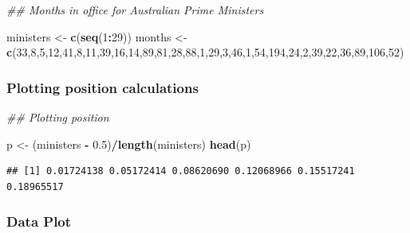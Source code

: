 \documentclass[
]{article}
\newenvironment{Shaded}{\begin{snugshade}}{\end{snugshade}}
\newcommand{\CommentTok}[1]{\textcolor[rgb]{0.56,0.35,0.01}{\textit{#1}}}
\newcommand{\DecValTok}[1]{\textcolor[rgb]{0.00,0.00,0.81}{#1}}
\newcommand{\FloatTok}[1]{\textcolor[rgb]{0.00,0.00,0.81}{#1}}
\newcommand{\KeywordTok}[1]{\textcolor[rgb]{0.13,0.29,0.53}{\textbf{#1}}}
\newcommand{\NormalTok}[1]{#1}
\newcommand{\OperatorTok}[1]{\textcolor[rgb]{0.81,0.36,0.00}{\textbf{#1}}}
\newcommand{\StringTok}[1]{\textcolor[rgb]{0.31,0.60,0.02}{#1}}
\begin{document}
\begin{Shaded}
\begin{Highlighting}[]
\CommentTok{## Months in office for Australian Prime Ministers}

\NormalTok{ministers <-}\StringTok{ }\KeywordTok{c}\NormalTok{(}\KeywordTok{seq}\NormalTok{(}\DecValTok{1}\OperatorTok{:}\DecValTok{29}\NormalTok{))}
\NormalTok{months <-}\StringTok{ }\KeywordTok{c}\NormalTok{(}\DecValTok{33}\NormalTok{,}\DecValTok{8}\NormalTok{,}\DecValTok{5}\NormalTok{,}\DecValTok{12}\NormalTok{,}\DecValTok{41}\NormalTok{,}\DecValTok{8}\NormalTok{,}\DecValTok{11}\NormalTok{,}\DecValTok{39}\NormalTok{,}\DecValTok{16}\NormalTok{,}\DecValTok{14}\NormalTok{,}\DecValTok{89}\NormalTok{,}\DecValTok{81}\NormalTok{,}\DecValTok{28}\NormalTok{,}\DecValTok{88}\NormalTok{,}\DecValTok{1}\NormalTok{,}\DecValTok{29}\NormalTok{,}\DecValTok{3}\NormalTok{,}\DecValTok{46}\NormalTok{,}\DecValTok{1}\NormalTok{,}\DecValTok{54}\NormalTok{,}\DecValTok{194}\NormalTok{,}\DecValTok{24}\NormalTok{,}\DecValTok{2}\NormalTok{,}\DecValTok{39}\NormalTok{,}\DecValTok{22}\NormalTok{,}\DecValTok{36}\NormalTok{,}\DecValTok{89}\NormalTok{,}\DecValTok{106}\NormalTok{,}\DecValTok{52}\NormalTok{)}
\end{Highlighting}
\end{Shaded}

\hypertarget{plotting-position-calculations}{%
\subsubsection{Plotting position
calculations}\label{plotting-position-calculations}}

\begin{Shaded}
\begin{Highlighting}[]
\CommentTok{## Plotting position}

\NormalTok{p <-}\StringTok{ }\NormalTok{(ministers }\OperatorTok{-}\StringTok{ }\FloatTok{0.5}\NormalTok{)}\OperatorTok{/}\KeywordTok{length}\NormalTok{(ministers)}
\KeywordTok{head}\NormalTok{(p)}
\end{Highlighting}
\end{Shaded}

\begin{verbatim}
## [1] 0.01724138 0.05172414 0.08620690 0.12068966 0.15517241 0.18965517
\end{verbatim}

\hypertarget{data-plot}{%
\subsubsection{Data Plot}\label{data-plot}}
\end{document}
